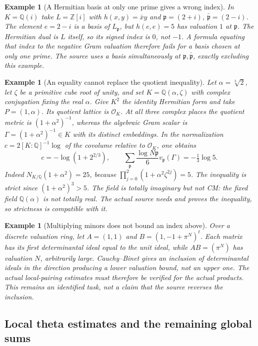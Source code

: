 \documentclass[11pt,a4paper]{article}
\newtheorem{example}[proposition]{Example}
\theoremstyle{remark}
\newcommand{\Z}{\mathbb Z}
\newcommand{\Q}{\mathbb Q}
\newcommand{\OO}{\mathcal O}
\begin{document}
\begin{example}[A Hermitian basis at only one prime gives a wrong index]
In $K=\Q(i)$ take $L=\Z[i]$ with $h(x,y)=\bar x y$ and
$\mathfrak p=(2+i)$, $\bar{\mathfrak p}=(2-i)$.
The element $e=2-i$ is a basis of $L_{\mathfrak p}$, but
$h(e,e)=5$ has valuation $1$ at $\mathfrak p$.
The Hermitian dual is $L$ itself, so its signed index is $0$,
not $-1$. A formula equating that index to the negative Gram
valuation therefore fails for a basis chosen at only one prime.
The source uses a basis simultaneously at
$\mathfrak p,\bar{\mathfrak p}$, exactly excluding this example.
\end{example}

\begin{example}[An equality cannot replace the quotient inequality]
Let $\alpha=\sqrt[3]2$, let $\zeta$ be a primitive cube root of
unity, and set $K=\Q(\alpha,\zeta)$ with complex conjugation
fixing the real $\alpha$. Give $K^2$ the identity Hermitian form
and take $P=(1,\alpha)$. Its quotient lattice is $\OO_K$.
At all three complex places the quotient metric is
$(1+\alpha^2)^{-1}$, whereas the algebraic Gram scalar is
$\Gamma=(1+\alpha^2)^{-1}\in K$ with its distinct embeddings.
In the normalization $c=2[K:\Q]^{-1}\log$ of the covolume
relative to $\OO_K$, one obtains
\[
 c=-\log(1+2^{2/3}),\qquad
 \sum_{\mathfrak p}\frac{\log N\mathfrak p}{6}
                  v_{\mathfrak p}(\Gamma)=-\tfrac13\log5.
\]
Indeed $N_{K/\Q}(1+\alpha^2)=25$, because
$\prod_{j=0}^2(1+\alpha^2\zeta^{2j})=5$.
The inequality is strict since $(1+\alpha^2)^3>5$.
The field is totally imaginary but not CM: the fixed field
$\Q(\alpha)$ is not totally real. The actual source needs and
proves the inequality, so strictness is compatible with it.
\end{example}

\begin{example}[Multiplying minors does not bound an index above]
Over a discrete valuation ring, let
$A=(1,1)$ and $B=(1,-1+\pi^N)^t$. Each matrix has its first
determinantal ideal equal to the unit ideal, while $AB=(\pi^N)$
has valuation $N$, arbitrarily large. Cauchy--Binet gives an
inclusion of determinantal ideals in the direction producing a
lower valuation bound, not an upper one. The actual local-pairing
estimates must therefore be verified for the actual products.
This remains an identified task, not a claim that the source
reverses the inclusion.
\end{example}

\subsection{Local theta estimates and the remaining global sums}
\end{document}
